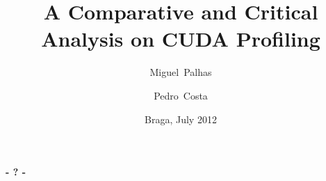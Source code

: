\documentclass{beamer}
\title[CUDA Profiling]{A Comparative and Critical Analysis on CUDA Profiling}
\author[M. Palhas, P. Costa]{Miguel~Palhas \and Pedro~Costa}
\institute[pg19808,pg19828]{
	Department of Informatics\\
	University of Minho
}
\date{Braga, July 2012}
\begin{document}

\frame[plain]{\titlepage}


\frame{\tableofcontents}



\begin{frame}[plain]
	\titlepage
	\begin{center}
		\Huge\bfseries - ? -
	\end{center}
\end{frame}
\end{document}
